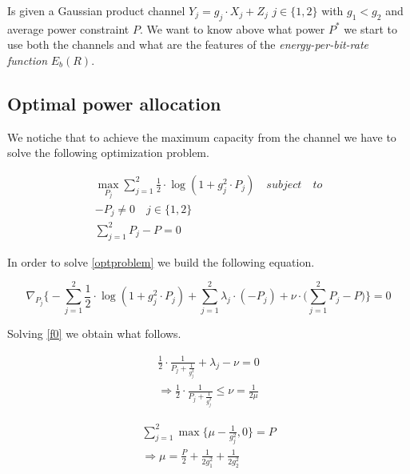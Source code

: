 

Is given a Gaussian product channel $Y_j = g_j \cdot X_j + Z_j$ $j\in \{1,2\}$ with $g_1 < g_2$ and average power constraint $P$. We want to know above what power $P^*$ we start to use both the channels and what are the features of the \textit{energy-per-bit-rate function} $E_b(R)$.

\subsection{Optimal power allocation}


We notiche that to achieve the maximum capacity from the channel we have to solve the following optimization problem.

\begin{equation}
\begin{gathered}
	\max_{P_j} \sum_{j=1}^2 \frac{1}{2} \cdot \log(1+g_j^2 \cdot P_j) \quad subject \quad to\\
	-P_j \neq 0 \quad j\in \{1,2\} \\
	\sum_{j=1}^2 P_j - P = 0
\end{gathered}
\label{optproblem}
\end{equation}

In order to solve \eqref{optproblem} we build the following equation.

\begin{equation}
	\nabla_{P_j}\Big\{-\sum_{j=1}^2 \frac{1}{2} \cdot \log(1+g_j^2 \cdot P_j) + \sum_{j=1}^2 \lambda_j \cdot (-P_j) + \nu \cdot \Big(\sum_{j=1}^2 P_j - P\Big)  \Big\} = 0
	\label{f0}
\end{equation}

Solving \eqref{f0} we obtain what follows.

\begin{equation}
	\begin{gathered}
		\frac{1}{2} \cdot \frac{1}{P_j+\frac{1}{g_j^2}}+\lambda_j-\nu=0 \\
		\Rightarrow \frac{1}{2} \cdot \frac{1}{P_j+\frac{1}{g_j^2}} \leq \nu = \frac{1}{2\mu}
	\end{gathered}
\end{equation}

\begin{equation}
	\begin{gathered}
		\sum_{j=1}^2 \max\Big\{\mu - \frac{1}{g_j^2},0\Big\} = P \\
		\Rightarrow \mu = \frac{P}{2}+\frac{1}{2g_1^2} + \frac{1}{2g_2^2}
	\end{gathered}
\end{equation}

